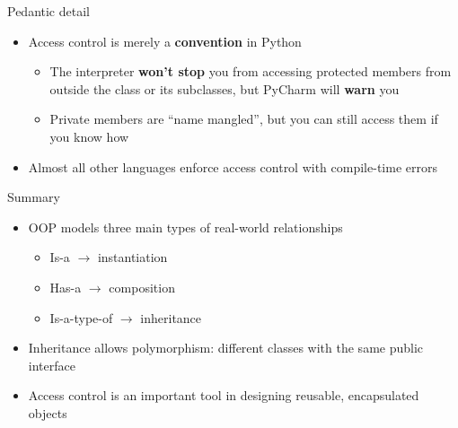 \begin{frame}{Pedantic detail}
\begin{itemize}
	\pause\item Access control is merely a \textbf{convention} in Python
	\begin{itemize}
		\pause\item The interpreter \textbf{won't stop} you from accessing protected members from outside the class or its subclasses, but PyCharm will \textbf{warn} you
		\pause\item Private members are ``name mangled'', but you can still access them if you know how
	\end{itemize}
	\pause\item Almost all other languages enforce access control with compile-time errors
\end{itemize}
\end{frame}

\begin{frame}{Summary}
\begin{itemize}
	\pause\item OOP models three main types of real-world relationships
	\begin{itemize}
		\pause\item Is-a $\to$ instantiation
		\pause\item Has-a $\to$ composition
		\pause\item Is-a-type-of $\to$ inheritance
	\end{itemize}
	\pause\item Inheritance allows polymorphism: different classes with the same public interface
	\pause\item Access control is an important tool in designing reusable, encapsulated objects
\end{itemize}
\end{frame}
